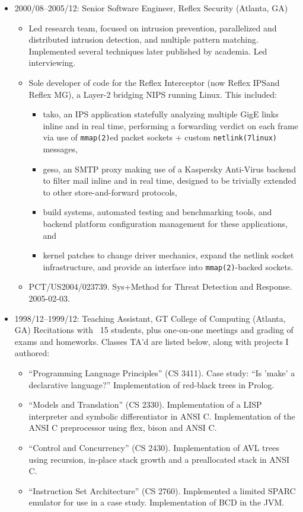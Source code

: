 \documentclass{article}
\newenvironment{tightitemize}
{\begin{itemize}
  \setlength{\itemsep}{1pt}
  \setlength{\parskip}{0pt}
  \setlength{\parsep}{0pt}}
{\end{itemize}}
\begin{document}
\begin{tightitemize}
\item 2000/08--2005/12: Senior Software Engineer, Reflex Security (Atlanta, GA)
\begin{tightitemize}
\item Led research team, focused on intrusion prevention, parallelized and
  distributed intrusion detection, and multiple pattern matching. Implemented
  several techniques later published by academia. Led interviewing.
\item Sole developer of code for the Reflex Interceptor (now Reflex IPS\texttrademark and
  Reflex MG\texttrademark), a Layer-2 bridging NIPS running Linux. This included:
\begin{tightitemize}
    \item tako, an IPS application statefully analyzing multiple GigE links inline
      and in real time, performing a forwarding verdict on each frame via use
      of \texttt{mmap(2)}ed packet sockets + custom \texttt{netlink(7linux)} messages,
    \item geso, an SMTP proxy making use of a Kaspersky Anti-Virus backend to
      filter mail inline and in real time, designed to be trivially extended
      to other store-and-forward protocols,
    \item build systems, automated testing and benchmarking tools, and backend
      platform configuration management for these applications, and
    \item kernel patches to change driver mechanics, expand the netlink socket
      infrastructure, and provide an interface into \texttt{mmap(2)}-backed sockets.
\end{tightitemize}
\item PCT/US2004/023739. Sys+Method for Threat Detection and Response. 2005-02-03.
\end{tightitemize}

\item 1998/12--1999/12: Teaching Assistant, GT College of Computing (Atlanta, GA)
Recitations with ~15 students, plus one-on-one meetings and grading of exams
and homeworks. Classes TA'd are listed below, along with projects I authored:
\begin{tightitemize}
\item ``Programming Language Principles'' (CS 3411). Case study: ``Is 'make' a
   declarative language?'' Implementation of red-black trees in Prolog.
\item ``Models and Translation'' (CS 2330). Implementation of a LISP interpreter
   and symbolic differentiator in ANSI C. Implementation of the ANSI C
   preprocessor using flex, bison and ANSI C.
\item ``Control and Concurrency'' (CS 2430). Implementation of AVL trees using
   recursion, in-place stack growth and a preallocated stack in ANSI C.
\item ``Instruction Set Architecture'' (CS 2760). Implemented a limited SPARC
   emulator for use in a case study. Implementation of BCD in the JVM.
\end{tightitemize}


\end{tightitemize}
\end{document}
